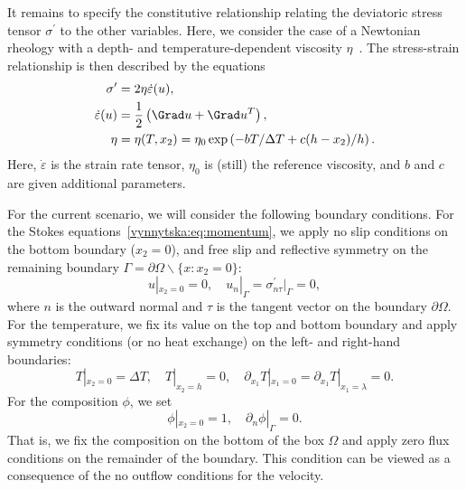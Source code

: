 It remains to specify the constitutive relationship relating the
deviatoric stress tensor $\sigma^{\prime}$ to the other
variables. Here, we consider the case of a Newtonian rheology with a
depth- and temperature-dependent viscosity
$\eta$~\citep{BlankenbachBusse1989}. The stress-strain relationship is
then described by the equations
\begin{align}
  \sigma^{\prime} &= 2 \eta \dot{\varepsilon} (u),
\\
  \dot{\varepsilon}(u) &= \frac{1}{2} \left (\Grad u + \Grad u^T \right),
\\
  \eta &= \eta(T, x_2) = \eta_0 \exp \left( -b T/\Delta T + c (h - x_2)/ h \right) .
\end{align}
Here, $\dot {\varepsilon}$ is the strain rate tensor, $\eta_0$ is (still)
the reference viscosity, and $b$ and $c$ are given additional parameters.

For the current scenario, we will consider the following boundary
conditions. For the Stokes equations~\eqref{vynnytska:eq:momentum}, we
apply no slip conditions on the bottom boundary ($x_2 = 0$), and free
slip and reflective symmetry on the remaining boundary $\Gamma
= \partial \Omega \backslash \{x: x_2 = 0 \}$:
\begin{equation}
  \label{vynnytska:eq:bcs}
  u |_{x_2 = 0} = 0, \quad
  u_n|_{\Gamma}  =  \sigma^{\prime}_{n \tau} |_{\Gamma} = 0,
\end{equation}
where $n$ is the outward normal and $\tau$ is the tangent vector on
the boundary $\partial \Omega$. For the temperature, we fix its value
on the top and bottom boundary and apply symmetry conditions (or no
heat exchange) on the left- and right-hand boundaries:
\begin{equation}
  T |_{x_2 = 0} = \Delta T, \quad T |_{x_2 = h}  = 0, \quad
  \partial_{x_1} T |_{x_1 = 0}  = \partial_{x_1} T |_{x_1 = \lambda} = 0.
\end{equation}
For the composition $\phi$, we set
\begin{equation}
  \phi |_{x_2 = 0} = 1, \quad \partial_{n} \phi|_{\Gamma} = 0.
\end{equation}
That is, we fix the composition on the bottom of the box $\Omega$
and apply zero flux conditions on the remainder of the boundary. This
condition can be viewed as a consequence of the no outflow conditions
for the velocity.

